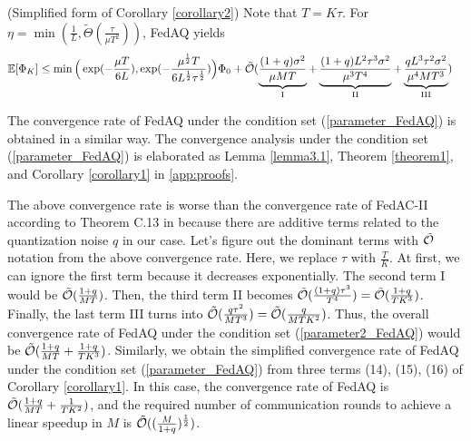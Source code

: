 \documentclass[11pt]{article}
\begin{document}
\begin{corollary}
    (Simplified form of Corollary \ref{corollary2}) Note that $T = K\tau$. For $\eta = \min(\frac{1}{L}, \tilde{\Theta} (  \frac{\tau}{\mu T^2} ))$, FedAQ yields
    \begin{align*}
        \mathbb{E}[\Phi_K] &\leq \min \Big( \exp(-\frac{\mu T}{6L}), \exp(-\frac{\mu^{\frac{1}{2}}T}{6 L^{\frac{1}{2}}\tau^{\frac{1}{2}}})\Big) \Phi_0 + \Tilde{\mathcal{O}}( \underbrace{\frac{(1+q)\sigma^2}{\mu MT}}_{\textrm{I}} + \underbrace{\frac{(1+q)L^2\tau^3\sigma^2}{\mu^3 T^4}}_{\textrm{II}} + \underbrace{\frac{qL^3 \tau^2 \sigma^2}{\mu^4 M T^3}}_{\textrm{III}})
    \end{align*}
\end{corollary}

The convergence rate of FedAQ under the condition set (\ref{parameter_FedAQ}) is obtained in a similar way. The convergence analysis under the condition set (\ref{parameter_FedAQ}) is elaborated as Lemma \ref{lemma3.1}, Theorem \ref{theorem1}, and Corollary \ref{corollary1} in \cref{app:proofs}.

\begin{remark} \label{remark5.4} The above convergence rate is worse than the convergence rate of FedAC-II according to Theorem C.13 in \cite{Yeojoon-yuan2020federated} because there are additive terms related to the quantization noise $q$ in our case. Let's figure out the dominant terms with $\Tilde{\mathcal{O}}$ notation from the above convergence rate. Here, we replace $\tau$ with $\frac{T}{K}$. At first, we can ignore the first term because it decreases exponentially. The second term I would be $\Tilde{\mathcal{O}}(\frac{1+q}{MT})$. Then, the third term II becomes $\Tilde{\mathcal{O}}(\frac{(1+q)\tau^3}{T^4}) = \Tilde{\mathcal{O}}(\frac{1+q}{TK^3})$. Finally, the last term III turns into $\Tilde{\mathcal{O}}(\frac{q\tau^2}{MT^3}) = \Tilde{\mathcal{O}}(\frac{q}{MTK^2})$. Thus, the overall convergence rate of FedAQ under the condition set (\ref{parameter2_FedAQ}) would be $\Tilde{\mathcal{O}}(\frac{1+q}{MT} + \frac{1+q}{TK^3})$. Similarly, we obtain the simplified convergence rate of FedAQ under the condition set (\ref{parameter_FedAQ}) from three terms (14), (15), (16) of Corollary \ref{corollary1}. In this case, the convergence rate of FedAQ is $\Tilde{\mathcal{O}}(\frac{1+q}{MT} + \frac{1}{TK^2})$, and the required number of communication rounds to achieve a linear speedup in $M$ is $\Tilde{\mathcal{O}}((\frac{M}{1+q})^{\frac{1}{2}})$. \end{remark}
\end{document}

